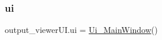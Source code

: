 \hypertarget{a00057_a86154c987d338cba4f5269407ad97f69}{}\label{a00057_a86154c987d338cba4f5269407ad97f69} 
\subsubsection{\texorpdfstring{ui}{ui}}
{\footnotesize\ttfamily output\+\_\+viewer\+U\+I.\+ui = \hyperlink{a00098}{Ui\+\_\+\+Main\+Window}()}

